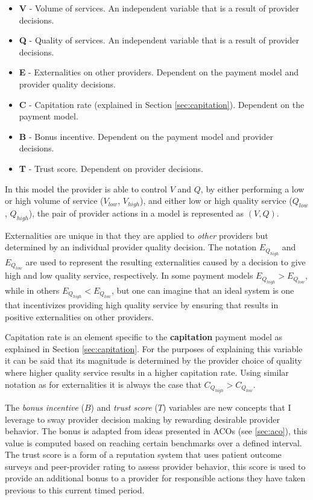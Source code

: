 \documentclass{article}
\begin{document}
\begin{itemize}
    \item \textbf{V} - Volume of services. An independent variable that is a result of provider decisions.
    \item \textbf{Q} - Quality of services. An independent variable that is a result of provider decisions.
    \item \textbf{E} - Externalities on other providers. Dependent on the payment model and provider quality decisions.
    \item \textbf{C} - Capitation rate (explained in Section \ref{sec:capitation}). Dependent on the payment model.
    \item \textbf{B} - Bonus incentive. Dependent on the payment model and provider decisions.
    \item \textbf{T} - Trust score. Dependent on provider decisions.
\end{itemize}

In this model the provider is able to control $V$ and $Q$, by either performing a low or high volume of service ($V_{low}$, $V_{high}$), and either low or high quality service ($Q_{low}$, $Q_{high}$), the pair of provider actions in a model is represented as $(V, Q)$.

Externalities are unique in that they are applied to \emph{other} providers but determined by an individual provider quality decision. The notation $E_{Q_{high}}$ and $E_{Q_{low}}$ are used to represent the resulting externalities caused by a decision to give high and low quality service, respectively. In some payment models $E_{Q_{high}} > E_{Q_{low}}$, while in others $E_{Q_{high}} < E_{Q_{low}}$, but one can imagine that an ideal system is one that incentivizes providing high quality service by ensuring that results in positive externalities on other providers.

Capitation rate is an element specific to the \textbf{capitation} payment model as explained in Section \ref{sec:capitation}. For the purposes of explaining this variable it can be said that its magnitude is determined by the provider choice of quality where higher quality service results in a higher capitation rate. Using similar notation as for externalities it is always the case that $C_{Q_{high}} > C_{Q_{low}}$.

The \emph{bonus incentive} ($B$) and \emph{trust score} ($T$) variables are new concepts that I leverage to sway provider decision making by rewarding desirable provider behavior. The bonus is adapted from ideas presented in ACOs (see \ref{sec:aco}), this value is computed based on reaching certain benchmarks over a defined interval. The trust score is a form of a reputation system \cite{tim} that uses patient outcome surveys and peer-provider rating to assess provider behavior, this score is used to provide an additional bonus to a provider for responsible actions they have taken previous to this current timed period.
\end{document}
